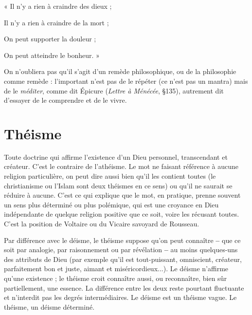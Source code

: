 \hspace{4.1cm} « Il n’y a rien à craindre des dieux ;

\hspace{4.1cm} Il n’y a rien à craindre de la mort ;

\hspace{4.1cm} On peut supporter la douleur ;

\hspace{4.1cm} On peut atteindre le bonheur. »

On n’oubliera pas qu’il s’agit d’un remède philosophique, ou de la philosophie
comme remède : l'important n’est pas de le répéter (ce n’est pas un
mantra) mais de le {\it méditer}, comme dit Épicure ({\it Lettre à Ménécée}, \S 135),
autrement dit d’essayer de le comprendre et de le vivre.

\section{Théisme}
Toute doctrine qui affirme l'existence d’un Dieu personnel,
transcendant et créateur. C’est le contraire de l’athéisme. Le mot
ne faisant référence à aucune religion particulière, on peut dire aussi bien qu’il les
contient toutes (le christianisme ou l’Islam sont deux théismes en ce sens) ou
qu'il ne saurait se réduire à aucune. C’est ce qui explique que le mot, en pratique,
prenne souvent un sens plus déterminé ou plus polémique, qui est une croyance
en Dieu indépendante de quelque religion positive que ce soit, voire les récusant
toutes. C’est la position de Voltaire ou du Vicaire savoyard de Rousseau.

Par différence avec le déisme, le théisme suppose qu’on peut connaître {\bf --}
que ce soit par analogie, par raisonnement ou par révélation {\bf --} au moins
quelques-uns des attributs de Dieu (par exemple qu’il est tout-puissant, omniscient,
créateur, parfaitement bon et juste, aimant et miséricordieux...). Le
déisme n’affirme qu’une existence ; le théisme croit connaître aussi, ou reconnaître,
bien sûr partiellement, une essence. La différence entre les deux reste
pourtant fluctuante et n’interdit pas les degrés intermédiaires. Le déisme est un
théisme vague. Le théisme, un déisme déterminé.

